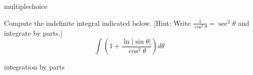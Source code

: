 \documentclass{ximera}
\begin{document}
\begin{question}[2016C.05]
\begin{type}
multiplechoice
\end{type}
Compute the indefinite integral indicated below. [Hint: Write \(\displaystyle \frac{1}{\cos^2 \theta} = \sec^2 \theta\) and integrate by parts.]
\[ \int \left( 1 + \frac{\ln | \sin \theta|}{\cos^2 \theta} \right) d \theta \]
\begin{multiplechoice}
 \choicebreak
{}
\end{multiplechoice}
\begin{keywords}
integration by parts
\end{keywords}
\end{question}
\end{document}

